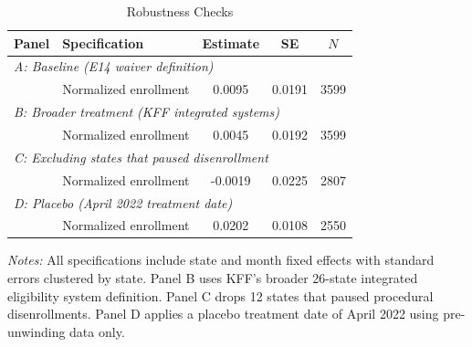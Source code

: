 \begin{table}[t]
\centering
\caption{Robustness Checks}
\label{tab:robustness}
\small
\begin{tabular}{llccc}
\toprule
Panel & Specification & Estimate & SE & $N$ \\
\midrule
\multicolumn{5}{l}{\textit{A: Baseline (E14 waiver definition)}} \\
 & Normalized enrollment & 0.0095 & 0.0191 & 3599 \\
\multicolumn{5}{l}{\textit{B: Broader treatment (KFF integrated systems)}} \\
 & Normalized enrollment & 0.0045 & 0.0192 & 3599 \\
\multicolumn{5}{l}{\textit{C: Excluding states that paused disenrollment}} \\
 & Normalized enrollment & -0.0019 & 0.0225 & 2807 \\
\multicolumn{5}{l}{\textit{D: Placebo (April 2022 treatment date)}} \\
 & Normalized enrollment & 0.0202 & 0.0108 & 2550 \\
\bottomrule
\end{tabular}
\begin{tablenotes}
\item \textit{Notes:} All specifications include state and month fixed effects with standard errors clustered by state. Panel B uses KFF's broader 26-state integrated eligibility system definition. Panel C drops 12 states that paused procedural disenrollments. Panel D applies a placebo treatment date of April 2022 using pre-unwinding data only.
\end{tablenotes}
\end{table}

